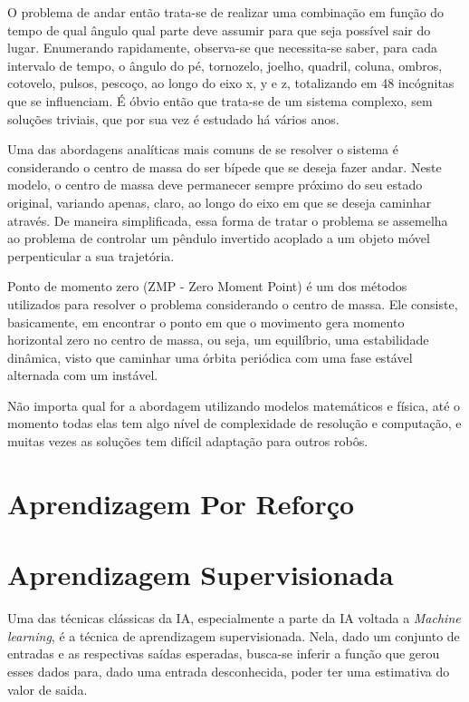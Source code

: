 \documentclass[twoside,conference,a4paper]{IEEEtran}
\begin{document}
O problema de andar então trata-se de realizar uma combinação em função do tempo de qual ângulo qual parte deve assumir para que seja possível sair do lugar. Enumerando rapidamente, observa-se que necessita-se saber, para cada intervalo de tempo, o ângulo do pé, tornozelo, joelho, quadril, coluna, ombros, cotovelo, pulsos, pescoço, ao longo do eixo x, y e z, totalizando em 48 incógnitas que se influenciam. É óbvio então que trata-se de um sistema complexo, sem soluções triviais, que por sua vez é estudado há vários anos.

Uma das abordagens analíticas mais comuns de se resolver o sistema é considerando o centro de massa do ser bípede que se deseja fazer andar. Neste modelo, o centro de massa deve permanecer sempre próximo do seu estado original, variando apenas, claro, ao longo do eixo em que se deseja caminhar através. De maneira simplificada, essa forma de tratar o problema se assemelha ao problema de controlar um pêndulo invertido acoplado a um objeto móvel perpenticular a sua trajetória.

Ponto de momento zero (ZMP - Zero Moment Point) é um dos métodos utilizados para resolver o problema considerando o centro de massa. Ele consiste, basicamente, em encontrar o ponto em que o movimento gera momento horizontal zero no centro de massa, ou seja, um equilíbrio, uma estabilidade dinâmica, visto que caminhar uma órbita periódica com uma fase estável alternada com um instável.

Não importa qual for a abordagem utilizando modelos matemáticos e física, até o momento todas elas tem algo nível de complexidade de resolução e computação, e muitas vezes as soluções tem difícil adaptação para outros robôs.

\section{Aprendizagem Por Reforço} \label{aprendizagem_por_reforco}

\section{Aprendizagem Supervisionada} \label{aprendizagem_supervisionada}

Uma das técnicas clássicas da IA, especialmente a parte da IA voltada a \textsl{Machine learning}, é a técnica de aprendizagem supervisionada. Nela, dado um conjunto de entradas e as respectivas saídas esperadas, busca-se inferir a função que gerou esses dados para, dado uma entrada desconhecida, poder ter uma estimativa do valor de saida.
\end{document}
